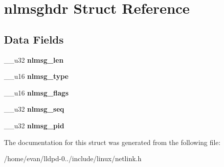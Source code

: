 \section{nlmsghdr \-Struct \-Reference}
\label{structnlmsghdr}
\subsection*{\-Data \-Fields}
\begin{DoxyCompactItemize}
\item 
\-\_\-\-\_\-u32 {\bfseries nlmsg\-\_\-len}\label{structnlmsghdr_a7697b35794cef511b077a5f04553844d}

\item 
\-\_\-\-\_\-u16 {\bfseries nlmsg\-\_\-type}\label{structnlmsghdr_ac6f43f4467160260983d50d2f28b7dfa}

\item 
\-\_\-\-\_\-u16 {\bfseries nlmsg\-\_\-flags}\label{structnlmsghdr_af7b94c18e60feaa7a0c7445d5095e7da}

\item 
\-\_\-\-\_\-u32 {\bfseries nlmsg\-\_\-seq}\label{structnlmsghdr_a23e590054afbb9367a2ee3aa876605cb}

\item 
\-\_\-\-\_\-u32 {\bfseries nlmsg\-\_\-pid}\label{structnlmsghdr_a41fb79b1cdceae37d09827ec8e938689}

\end{DoxyCompactItemize}


\-The documentation for this struct was generated from the following file\-:\begin{DoxyCompactItemize}
\item 
/home/evan/lldpd-\/0../include/linux/netlink.\-h\end{DoxyCompactItemize}

